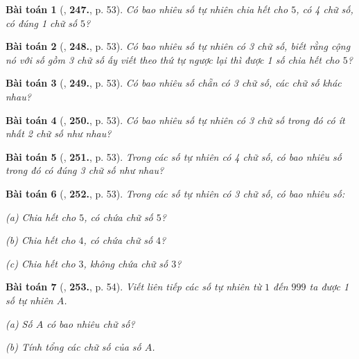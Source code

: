 \documentclass{article}
\numberwithin{equation}{section}
\newtheorem{baitoan}{Bài toán}[section]
\begin{document}
\begin{baitoan}[\cite{Binh_Toan_6_tap_1}, \textbf{247.}, p. 53]
	Có bao nhiêu số tự nhiên chia hết cho $5$, có 4 chữ số, có đúng 1 chữ số $5$?
\end{baitoan}

\begin{baitoan}[\cite{Binh_Toan_6_tap_1}, \textbf{248.}, p. 53]
	Có bao nhiêu số tự nhiên có 3 chữ số, biết rằng cộng nó với số gồm 3 chữ số ấy viết theo thứ tự ngược lại thì được 1 số chia hết cho $5$?
\end{baitoan}

\begin{baitoan}[\cite{Binh_Toan_6_tap_1}, \textbf{249.}, p. 53]
	Có bao nhiêu số chẵn có 3 chữ số, các chữ số khác nhau?
\end{baitoan}

\begin{baitoan}[\cite{Binh_Toan_6_tap_1}, \textbf{250.}, p. 53]
	Có bao nhiêu số tự nhiên có 3 chữ số trong đó có ít nhất 2 chữ số như nhau?
\end{baitoan}

\begin{baitoan}[\cite{Binh_Toan_6_tap_1}, \textbf{251.}, p. 53]
	Trong các số tự nhiên có 4 chữ số, có bao nhiêu số trong đó có đúng 3 chữ số như nhau?
\end{baitoan}

\begin{baitoan}[\cite{Binh_Toan_6_tap_1}, \textbf{252.}, p. 53]
	Trong các số tự nhiên có 3 chữ số, có bao nhiêu số:
	\begin{enumerate*}
		\item[(a)] Chia hết cho $5$, có chứa chữ số $5$?
		\item[(b)] Chia hết cho $4$, có chứa chữ số $4$?
		\item[(c)] Chia hết cho $3$, không chứa chữ số $3$?
	\end{enumerate*}
\end{baitoan}

\begin{baitoan}[\cite{Binh_Toan_6_tap_1}, \textbf{253.}, p. 54]
	Viết liên tiếp các số tự nhiên từ $1$ đến $999$ ta được 1 số tự nhiên $A$.
	\begin{enumerate*}
		\item[(a)] Số $A$ có bao nhiêu chữ số?
		\item[(b)] Tính tổng các chữ số của số $A$.
	\end{enumerate*}
\end{baitoan}
\end{document}
